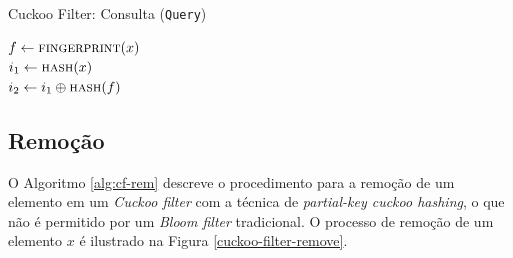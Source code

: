 \documentclass[12pt,twoside,english,brazilian]{book}
\begin{document}
\begin{algorithm}
    \caption{Cuckoo Filter: Consulta (\texttt{Query})}\label{alg:cf-cons}

    $f \leftarrow \Call{fingerprint}{x}$ \\
    $i_1 \leftarrow \Call{hash}{x}$ \\
    $i_2 \leftarrow i_1 \oplus \Call{hash}{f}$ \\
\end{algorithm}

\subsection{Remoção}

O Algoritmo \ref{alg:cf-rem} descreve o procedimento para a remoção de um elemento em um \textit{Cuckoo filter} com a técnica de \textit{partial-key cuckoo hashing}, o que não é permitido por um \textit{Bloom filter} tradicional. O processo de remoção de um elemento $x$ é ilustrado na Figura \ref{cuckoo-filter-remove}.
\end{document}
